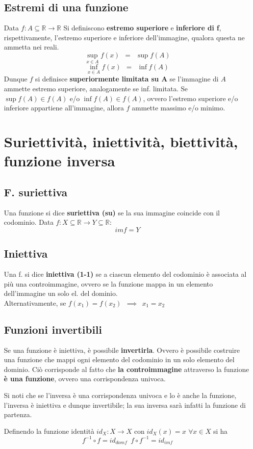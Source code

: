 \documentclass[10pt, oneside]{book}
\theoremstyle{plain}
\begin{document}
\subsection{Estremi di una funzione}
\begin{defin}
Data $f :  A \subseteq \mathbb{R} \rightarrow \mathbb{R}$ Si definiscono \textbf{estremo superiore} e \textbf{inferiore di f}, rispettivamente, l'estremo superiore e inferiore dell'immagine, qualora questa ne ammetta nei reali.
\[\sup \limits_{x \in A} f(x) \enspace = \enspace \sup f(A)\]
\[\inf \limits_{x \in A} f(x) \enspace = \enspace \inf f(A)\]
Dunque $f$ si definisce \textbf{superiormente limitata su A} se l'immagine di $A$ ammette estremo superiore, analogamente se inf. limitata. Se $\sup f(A) \in f(A)$ e/o $\inf f(A) \in f(A)$, ovvero l'estremo superiore e/o inferiore appartiene all'immagine, allora $f$ ammette massimo e/o minimo.
\end{defin}
\section{Suriettività, iniettività, biettività, funzione inversa}
\subsection{F. suriettiva}
\begin{defin}
Una funzione si dice \textbf{suriettiva (su)} se la sua immagine coincide con il codominio. Data $f : X \subseteq \mathbb{R} \rightarrow Y \subseteq \mathbb{R}$:
\[im f = Y\]
\end{defin}
\subsection{Iniettiva}
\begin{defin}
Una f. si dice \textbf{iniettiva (1-1)} se a ciascun elemento del codominio è associata al più una controimmagine, ovvero se la funzione mappa in un elemento dell'immagine un solo el. del dominio.
\\Alternativamente, se $f(x_1) = f(x_2) \enspace \implies \enspace x_1 = x_2$
\end{defin}

\subsection{Funzioni invertibili}
\begin{prop}
Se una funzione è iniettiva, è possibile \textbf{invertirla}. Ovvero è possibile costruire una funzione che mappi ogni elemento del codominio in un solo elemento del dominio. Ciò corrisponde al fatto che \textbf{la controimmagine} attraverso la funzione \textbf{è una funzione}, ovvero una corrispondenza univoca.
\end{prop}
\begin{oss}
Si noti che se l'inversa è una corrispondenza univoca e lo è anche la funzione, l'inversa è iniettiva e dunque invertibile; la sua inversa sarà infatti la funzione di partenza.
\end{oss}
Definendo la funzione identità $id_X : X \rightarrow X$ con $id_X (x) = x$ $\forall x \in X$ si ha
\[f^{-1} \circ f = id_{dom f} \enspace f \circ f^{-1} = id_{im f}\]
\end{document}
